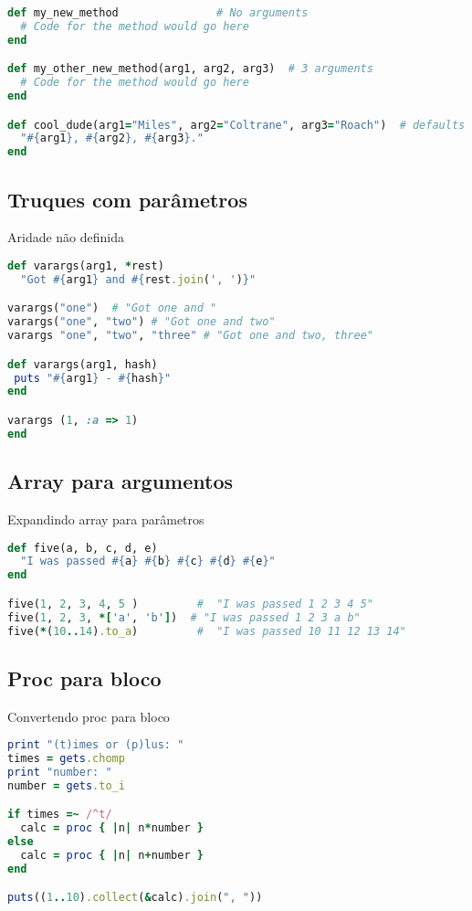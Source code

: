 \documentclass[serif,mathserif]{article}
\begin{document}
\begin{lstlisting}[language=ruby]
def my_new_method               # No arguments
  # Code for the method would go here
end

def my_other_new_method(arg1, arg2, arg3)  # 3 arguments
  # Code for the method would go here
end

def cool_dude(arg1="Miles", arg2="Coltrane", arg3="Roach")  # defaults
  "#{arg1}, #{arg2}, #{arg3}."
end
\end{lstlisting}

\subsection{Truques com parâmetros}

Aridade não definida

\begin{lstlisting}[language=ruby]
def varargs(arg1, *rest)
  "Got #{arg1} and #{rest.join(', ')}"

varargs("one")  # "Got one and "
varargs("one", "two") # "Got one and two"
varargs "one", "two", "three" # "Got one and two, three"

def varargs(arg1, hash)
 puts "#{arg1} - #{hash}"
end

varargs (1, :a => 1)
end
\end{lstlisting}

\subsection{Array para argumentos}

Expandindo array para parâmetros

\begin{lstlisting}[language=ruby]
def five(a, b, c, d, e)
  "I was passed #{a} #{b} #{c} #{d} #{e}"
end

five(1, 2, 3, 4, 5 )         #  "I was passed 1 2 3 4 5"
five(1, 2, 3, *['a', 'b'])  # "I was passed 1 2 3 a b"
five(*(10..14).to_a)         #  "I was passed 10 11 12 13 14"
\end{lstlisting}

\subsection{Proc para bloco}

Convertendo proc para bloco

\begin{lstlisting}[language=ruby]
print "(t)imes or (p)lus: "
times = gets.chomp
print "number: "
number = gets.to_i

if times =~ /^t/
  calc = proc { |n| n*number }
else
  calc = proc { |n| n+number }
end

puts((1..10).collect(&calc).join(", "))
\end{lstlisting}
\end{document}
